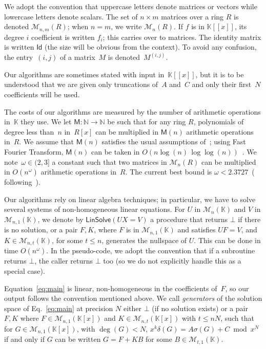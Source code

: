 \documentclass[]{sig-alternate}
\def\partial{\delta}
\def\LinAlg{\mathsf{LinSolve}}
\def\N {\ensuremath{\mathbb{N}}}
\def\K {\ensuremath{\mathbb{K}}}
\def\M {\ensuremath{\mathsf{M}}}
\def\Id{\ensuremath{\mathsf{Id}}}
\begin{document}
\smallskip{}  We adopt the
convention that uppercase letters denote matrices or vectors while lowercase
letters denote scalars. The set of $n \times m$ matrices over a ring
$R$ is denoted $\mathscr{M}_{n,m}(R)$; when $n=m$, we write
$\mathscr{M}_{n}(R)$.  If $f$ is in $\K[[x]]$, its degree $i$
coefficient is written $f_i$; this carries over to matrices. The
identity matrix is written $\Id$ (the size will be obvious from
the context). To avoid any confusion, the entry~$(i,j)$ of a
matrix~$M$ is denoted~$M^{(i,j)}$. 

Our algorithms are sometimes stated with input in~$\K[[x]]$, but it is
to be understood that we are given only truncations of~$A$ and~$C$ and
only their first~$N$ coefficients will be used.

The costs of our algorithms are measured by the number of arithmetic
operations in~$\K$ they use. We let $\M: \N \rightarrow \N$ be such
that for any ring $R$, polynomials of degree less than~$n$ in~$R[x]$
can be multiplied in $\M(n)$ arithmetic operations
in~$R$. We assume that $\M(n)$ satisfies the usual
assumptions of~\cite[\S8.3]{GaGe99}; using Fast Fourier Transform,
$\M(n)$ can be taken in $O(n \log (n)\,\log\log
(n))$~\cite{CaKa91,ScSt71}. We note~$\omega\in(2,3]$ a
constant such that two matrices in $\mathscr{M}_n(R)$ can be
multiplied in $O(n^\omega)$ arithmetic operations in~$R$. The current
best  bound is $\omega <
2.3727$~(\cite{VassilevskaWilliams11} following~\cite{CoWi90,Stothers10}).

Our algorithms rely on linear algebra techniques; in particular, we
have to solve several systems of non-homogeneous linear equations. For
$U$ in $\mathscr{M}_n(\K)$ and $V$ in $\mathscr{M}_{n,1}(\K)$, we
denote by $\LinAlg(UX=V)$ a procedure that returns $\bot$ if there is
no solution, or a pair $F,K$, where $F$ is in $\mathscr{M}_{n,1}(\K)$
and satisfies $UF=V$, and $K\in \mathscr{M}_{n,t}(\K)$, for some $t\le
n$, generates the nullspace of $U$. This can be done in time
$O(n^\omega)$. In the pseudo-code, we adopt the convention that if a
subroutine returns $\bot$, the caller returns $\bot$ too (so we do not
explicitly handle this as a special case).

\smallskip{}  Equation~\eqref{eq:main} is
linear, non-homogeneous in the coefficients of~$F$, so our output
follows the convention mentioned above. We call {\em generators} of
the solution space of Eq.~\eqref{eq:main} at precision $N$ either
$\bot$ (if no solution exists) or a pair $F,K$ 
where $F\in\mathscr{M}_{n,1}(\K[x])$ and $K\in\mathscr{M}_{n,t}(\K[x])$ with $t \le
nN$, such that for $G\in \mathscr{M}_{n,1}(\K[x])$, with $\deg(G)<N$,
$x^k \partial(G) = A \sigma(G) + C \bmod x^N$ if and only if $G$ can
be written $G=F + K B$ for some $B\in \mathscr{M}_{t,1}(\K)$. 
\end{document}
